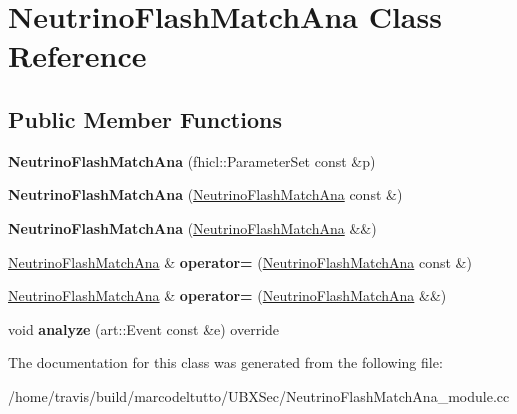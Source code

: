 \hypertarget{classNeutrinoFlashMatchAna}{\section{\-Neutrino\-Flash\-Match\-Ana \-Class \-Reference}
\label{classNeutrinoFlashMatchAna}
}
\subsection*{\-Public \-Member \-Functions}
\begin{DoxyCompactItemize}
\item 
\hypertarget{classNeutrinoFlashMatchAna_a5d2b11f559004cc87a73de6594ac8545}{{\bfseries \-Neutrino\-Flash\-Match\-Ana} (fhicl\-::\-Parameter\-Set const \&p)}\label{classNeutrinoFlashMatchAna_a5d2b11f559004cc87a73de6594ac8545}

\item 
\hypertarget{classNeutrinoFlashMatchAna_a3bfab6bb2a3b47753c19dddb44556759}{{\bfseries \-Neutrino\-Flash\-Match\-Ana} (\hyperlink{classNeutrinoFlashMatchAna}{\-Neutrino\-Flash\-Match\-Ana} const \&)}\label{classNeutrinoFlashMatchAna_a3bfab6bb2a3b47753c19dddb44556759}

\item 
\hypertarget{classNeutrinoFlashMatchAna_af7499873d235017c54f98bdfb19d524f}{{\bfseries \-Neutrino\-Flash\-Match\-Ana} (\hyperlink{classNeutrinoFlashMatchAna}{\-Neutrino\-Flash\-Match\-Ana} \&\&)}\label{classNeutrinoFlashMatchAna_af7499873d235017c54f98bdfb19d524f}

\item 
\hypertarget{classNeutrinoFlashMatchAna_ac33d1ac09eca2ce10e527a7d5d030500}{\hyperlink{classNeutrinoFlashMatchAna}{\-Neutrino\-Flash\-Match\-Ana} \& {\bfseries operator=} (\hyperlink{classNeutrinoFlashMatchAna}{\-Neutrino\-Flash\-Match\-Ana} const \&)}\label{classNeutrinoFlashMatchAna_ac33d1ac09eca2ce10e527a7d5d030500}

\item 
\hypertarget{classNeutrinoFlashMatchAna_a46bec0fb2d5f93d7ae58af587290269b}{\hyperlink{classNeutrinoFlashMatchAna}{\-Neutrino\-Flash\-Match\-Ana} \& {\bfseries operator=} (\hyperlink{classNeutrinoFlashMatchAna}{\-Neutrino\-Flash\-Match\-Ana} \&\&)}\label{classNeutrinoFlashMatchAna_a46bec0fb2d5f93d7ae58af587290269b}

\item 
\hypertarget{classNeutrinoFlashMatchAna_a3cbef678fcb1757e76b640d63f7bf2c0}{void {\bfseries analyze} (art\-::\-Event const \&e) override}\label{classNeutrinoFlashMatchAna_a3cbef678fcb1757e76b640d63f7bf2c0}

\end{DoxyCompactItemize}


\-The documentation for this class was generated from the following file\-:\begin{DoxyCompactItemize}
\item 
/home/travis/build/marcodeltutto/\-U\-B\-X\-Sec/\-Neutrino\-Flash\-Match\-Ana\-\_\-module.\-cc\end{DoxyCompactItemize}

